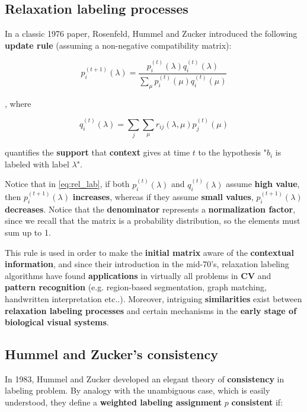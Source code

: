\subsection{Relaxation labeling processes}

In a classic 1976 paper, Rosenfeld, Hummel and Zucker introduced the following \textbf{update rule} (assuming a non-negative compatibility matrix):

\begin{equation}\label{eq:rel_lab}
    p_i^{(t+1)}(\lambda) = \frac{p_i^{(t)}(\lambda) q_i^{(t)}(\lambda)}{\sum_{\mu} p_i^{(t)}(\mu) q_i^{(t)}(\mu)}
\end{equation}

, where 

$$
q_i^{(t)}(\lambda) = \sum_j \sum_{\mu} r_{ij}(\lambda, \mu) p_j^{(t)} (\mu)
$$

quantifies the \textbf{support} that \textbf{context} gives at time $t$ to the hypothesis "$b_i$ is labeled with label $\lambda$".

Notice that in \ref{eq:rel_lab}, if both $p_i^{(t)}(\lambda)$ and $q_i^{(t)}(\lambda)$ assume \textbf{high value}, then $ p_i^{(t+1)}(\lambda)$ \textbf{increases}, whereas if they assume \textbf{small values}, $p_i^{(t+1)}(\lambda)$ \textbf{decreases}. Notice that the \textbf{denominator} represents a \textbf{normalization factor}, since we recall that the matrix is a probability distribution, so the elements must sum up to 1. 

This rule is used in order to make the \textbf{initial matrix} aware of the \textbf{contextual information}, and since their introduction in the mid-70's, relaxation labeling algorithms have found \textbf{applications} in virtually all problems in \textbf{CV} and \textbf{pattern recognition} (e.g. region-based segmentation, graph matching, handwritten interpretation etc..). Moreover, intriguing \textbf{similarities} exist between \textbf{relaxation labeling processes} and certain mechanisms in the \textbf{early stage of biological visual systems}.

\subsection{Hummel and Zucker's consistency}
In 1983, Hummel and Zucker developed an elegant theory of \textbf{consistency}
in labeling problem. By analogy with the unambiguous case, which is easily understood, they define a \textbf{weighted labeling assignment} $p$ \textbf{consistent} if:

